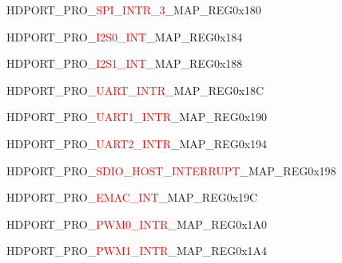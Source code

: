 \vspace{-3em}
\begin{register}{H}{DPORT\_PRO\_\textcolor{red}{SPI\_INTR\_3}\_MAP\_REG}{0x180}\label{regdesc:PROSPIINTR3MAPREG}
\end{register}
\vspace{-3em}
\begin{register}{H}{DPORT\_PRO\_\textcolor{red}{I2S0\_INT}\_MAP\_REG}{0x184}\label{regdesc:PROI2S0INTMAPREG}
\end{register}
\vspace{-3em}
\begin{register}{H}{DPORT\_PRO\_\textcolor{red}{I2S1\_INT}\_MAP\_REG}{0x188}\label{regdesc:PROI2S1INTMAPREG}
\end{register}
\vspace{-3em}
\begin{register}{H}{DPORT\_PRO\_\textcolor{red}{UART\_INTR}\_MAP\_REG}{0x18C}\label{regdesc:PROUARTINTRMAPREG}
\end{register}
\vspace{-3em}
\begin{register}{H}{DPORT\_PRO\_\textcolor{red}{UART1\_INTR}\_MAP\_REG}{0x190}\label{regdesc:PROUART1INTRMAPREG}
\end{register}
\vspace{-3em}
\begin{register}{H}{DPORT\_PRO\_\textcolor{red}{UART2\_INTR}\_MAP\_REG}{0x194}\label{regdesc:PROUART2INTRMAPREG}
\end{register}
\vspace{-3em}
\begin{register}{H}{DPORT\_PRO\_\textcolor{red}{SDIO\_HOST\_INTERRUPT}\_MAP\_REG}{0x198}\label{regdesc:PROSDIOHOSTINTERRUPTMAPREG}
\end{register}
\vspace{-3em}
\begin{register}{H}{DPORT\_PRO\_\textcolor{red}{EMAC\_INT}\_MAP\_REG}{0x19C}\label{regdesc:PROEMACINTMAPREG}
\end{register}
\vspace{-3em}
\begin{register}{H}{DPORT\_PRO\_\textcolor{red}{PWM0\_INTR}\_MAP\_REG}{0x1A0}\label{regdesc:PROPWM0INTRMAPREG}
\end{register}
\vspace{-3em}
\begin{register}{H}{DPORT\_PRO\_\textcolor{red}{PWM1\_INTR}\_MAP\_REG}{0x1A4}\label{regdesc:PROPWM1INTRMAPREG}
\end{register}
\vspace{-3em}

